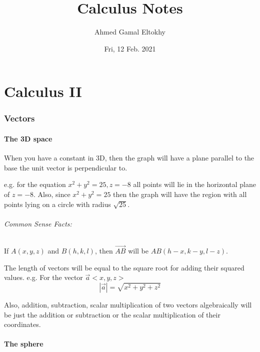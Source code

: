 \documentclass{article}
\title{Calculus Notes}
\date{Fri, 12 Feb. 2021}
\author{Ahmed Gamal Eltokhy}
\begin{document}
	\maketitle
	\newpage

	\tableofcontents
	\newpage


	\part{Calculus II}
	\newpage

	\section{Vectors}

	\subsection{The 3D space}

	When you have a constant in 3D, then the graph will have a plane parallel to the base the unit vector is perpendicular to.

	e.g. for the equation $x^2+y^2=25, z=-8$ all points will lie in the horizontal plane of $z=-8$. Also, since $x^2+y^2=25$ then the graph will have the region with all points lying on a circle with radius $\sqrt{25}$.

	\paragraph{Common Sense Facts:}

	If $A(x,y,z)$ and $B(h,k,l)$, then $\vec{AB}$ will be $AB(h-x, k-y, l-z)$.

	The length of vectors will be equal to the square root for adding their squared values. e.g. For the vector $\vec{a}<x,y,z>$
	\begin{equation*}
		|\vec{a}| = \sqrt{x^2+y^2+z^2}
	\end{equation*}

	Also, addition, subtraction, scalar multiplication of two vectors algebraically will be just the addition or subtraction or the scalar multiplication of their coordinates.



	\subsection{The sphere}
\end{document}
